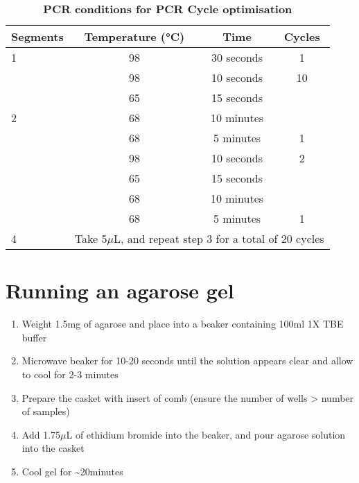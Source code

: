 \vspace{1cm}
\begin{table}[h]
	\centering
	\caption[PCR conditions for PCR Cycle optimisations]%
	{\textbf{PCR conditions for PCR Cycle optimisation}}
	\label{tab:PCR_condition_cycleoptim}
	\begin{tabularx}{0.8\textwidth}{lccc}
		\toprule
		Segments           & Temperature (°C)             & Time                  & Cycles            \\ \midrule
		1                  & 98                           & 30 seconds            & 1                 \\
		\multirow{5}{*}{2} & 98                           & 10 seconds            & 10                \\
		& 65                           & 15 seconds            &                   \\
		& 68                           & 10 minutes            &                   \\
		& 68                           & 5 minutes             & 1                 \\
		\multirow{4}{*}{3} & 98                           & 10 seconds            & 2                 \\
		& 65                           & 15 seconds            &                   \\
		& 68                           & 10 minutes            &                   \\
		& 68                           & 5 minutes             & 1                 \\
		4                  & \multicolumn{3}{c}{Take 5$\mu$L, and repeat step 3 for a total of 20 cycles} \\
		\bottomrule
	\end{tabularx}
\end{table}

	
\section{Running an agarose gel}
\label{Isoseq_Protocol_running_agarose_gel}
\begin{enumerate}
	\item Weight 1.5mg of agarose and place into a beaker containing 100ml 1X TBE buffer 
	\item Microwave beaker for 10-20 seconds until the solution appears clear and allow to cool for 2-3 minutes 
	\item Prepare the casket with insert of comb (ensure the number of wells > number of samples)
	\item Add 1.75$\mu$L of ethidium bromide into the beaker, and pour agarose solution into the casket 
	\item Cool gel for \textasciitilde20minutes
\end{enumerate} 

